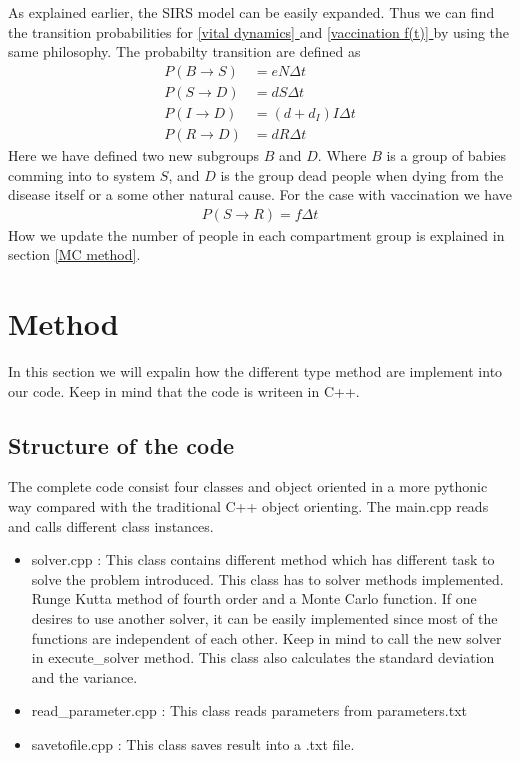 \documentclass[a4paper, 10pt]{article}
\newcommand*{\fullref}[1]{\hyperref[{#1}]{\autoref*{#1} \nameref*{#1}}}
\begin{document}
As explained earlier, the SIRS model can be easily expanded. Thus we can find the transition probabilities for
\fullref{vital dynamics} and \fullref{vaccination f(t)} by using the same philosophy. The probabilty transition are
defined as
\begin{align}
P(B \rightarrow S) &= eN \Delta t\\
  P(S \rightarrow D) &= dS \Delta t\\
  P(I \rightarrow D) &= (d + d_{I})I \Delta t\\
  P(R \rightarrow D) &= dR \Delta t
\end{align}
Here we have defined two new subgroups $B$ and $D$.
Where $B$ is a group of babies comming into to system $S$, and $D$ is the group dead people when dying
from the disease itself or a some other natural cause. For the case with vaccination we have
\begin{align}
  	P(S \rightarrow R) = f \Delta t
\end{align}
How we update the number of people in each compartment group is explained in section \eqref{MC method}.
\section{Method}\label{method}
In this section we will expalin how the different type method are implement
into our code. Keep in mind that the code is writeen in C++.
\subsection{Structure of the code}
The complete code consist four classes and object oriented in a more pythonic way compared
with the traditional C++ object orienting. The main.cpp reads and calls different class instances.
\begin{itemize}
  \item solver.cpp : This class contains different method which has different task to solve the problem introduced.
  This class has to solver methods implemented. Runge Kutta method of fourth order and a Monte Carlo function.
  If one desires to use another solver, it can be easily implemented since most of the functions are independent of each other.
  Keep in mind to call the new solver in execute\_solver method. This class also calculates the
  standard deviation and the variance.
  \item read\_parameter.cpp : This class reads parameters from parameters.txt
  \item savetofile.cpp : This class saves result into a .txt file.
\end{itemize}
\end{document}
